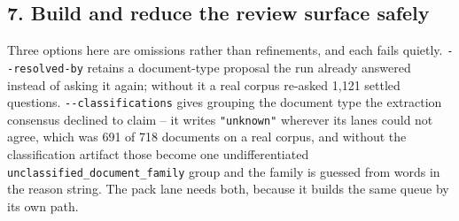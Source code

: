 \documentclass[
]{article}
\begin{document}
\subsection{7. Build and reduce the review surface
safely}\label{build-and-reduce-the-review-surface-safely}

Three options here are omissions rather than refinements, and each fails
quietly. \texttt{-\/-resolved-by} retains a document-type proposal the
run already answered instead of asking it again; without it a real
corpus re-asked 1,121 settled questions. \texttt{-\/-classifications}
gives grouping the document type the extraction consensus declined to
claim -- it writes \texttt{"unknown"} wherever its lanes could not
agree, which was 691 of 718 documents on a real corpus, and without the
classification artifact those become one undifferentiated
\texttt{unclassified\_\allowbreak{}document\_\allowbreak{}family} group
and the family is guessed from words in the reason string. The pack lane
needs both, because it builds the same queue by its own path.
\end{document}
